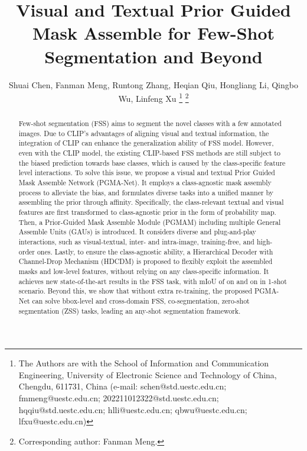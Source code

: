 \documentclass[lettersize,journal]{IEEEtran}
\begin{document}
\title{Visual and Textual Prior Guided Mask Assemble for Few-Shot Segmentation and Beyond}


\author{Shuai Chen, Fanman Meng, Runtong Zhang, Heqian Qiu, Hongliang Li, Qingbo Wu, Linfeng Xu
\thanks{The Authors are with the School of Information and Communication Engineering, University of Electronic Science and Technology of China, Chengdu, 611731, China (e-mail: schen@std.uestc.edu.cn; fmmeng@uestc.edu.cn; 202211012322@std.uestc.edu.cn; hqqiu@std.uestc.edu.cn; hlli@uestc.edu.cn; qbwu@uestc.edu.cn; lfxu@uestc.edu.cn)}
\thanks{Corresponding author: Fanman Meng.}
}



\maketitle


\begin{abstract}
    Few-shot segmentation (FSS) aims to segment the novel classes with a few annotated images. Due to CLIP's advantages of aligning visual and textual information, the integration of CLIP can enhance the generalization ability of FSS model. However, even with the CLIP model, the existing CLIP-based FSS methods are still subject to the biased prediction towards base classes, which is caused by the class-specific feature level interactions. To solve this issue, we propose a visual and textual Prior Guided Mask Assemble Network (PGMA-Net). It employs a class-agnostic mask assembly process to alleviate the bias, and formulates diverse tasks into a unified manner by assembling the prior through affinity. Specifically, the class-relevant textual and visual features are first transformed to class-agnostic prior in the form of probability map. Then, a Prior-Guided Mask Assemble Module (PGMAM) including multiple General Assemble Units (GAUs) is introduced. It considers diverse and plug-and-play interactions, such as visual-textual, inter- and intra-image, training-free, and high-order ones. Lastly, to ensure the class-agnostic ability, a Hierarchical Decoder with Channel-Drop Mechanism (HDCDM) is proposed to flexibly exploit the assembled masks and low-level features, without relying on any class-specific information. It achieves new state-of-the-art results in the FSS task, with mIoU of  on  and  on  in 1-shot scenario. Beyond this, we show that without extra re-training, the proposed PGMA-Net can solve bbox-level and cross-domain FSS, co-segmentation, zero-shot segmentation (ZSS) tasks, leading an any-shot segmentation framework. 
\end{abstract}
\end{document}
